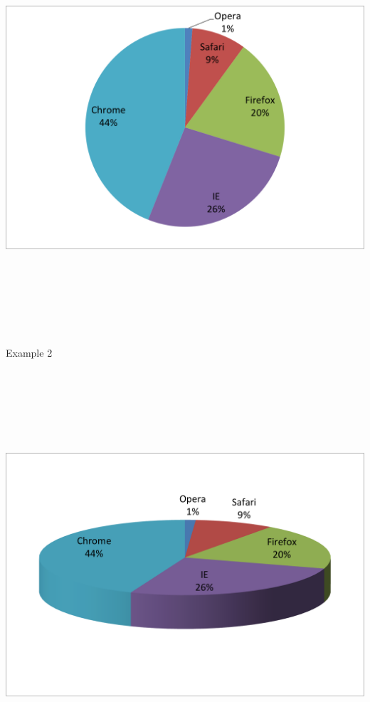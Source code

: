 \documentclass[12pt]{article}
\newcommand{\headsize}{\fontsize{35}{35} \selectfont}
\begin{document}
\centerline{\includegraphics[height=6in]{Figs/fig2c.png}}


\newpage


\headsize \color{yellow}
\hfill \begin{minipage}{5.75in}
\centering
Example 2
\end{minipage}

\vspace{30mm}

\centerline{\includegraphics[height=6in]{Figs/fig2d.png}}
\end{document}
